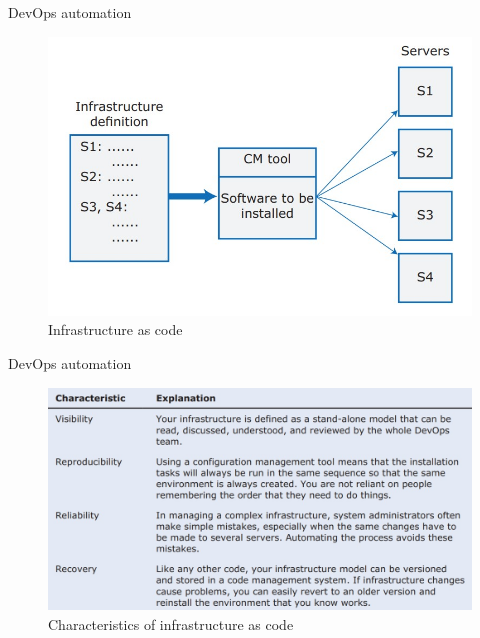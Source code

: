 \documentclass{beamer}
\begin{document}
\begin{frame}{DevOps automation}
	\begin{figure}
		\includegraphics[scale=.5]{img/m3_44}
		\caption{Infrastructure as code}
	\end{figure}
\end{frame}
\begin{frame}{DevOps automation}
	\begin{figure}
		\includegraphics[scale=.43]{img/m3_46}
		\caption{Characteristics of infrastructure as code}
	\end{figure}
\end{frame}
\end{document}
